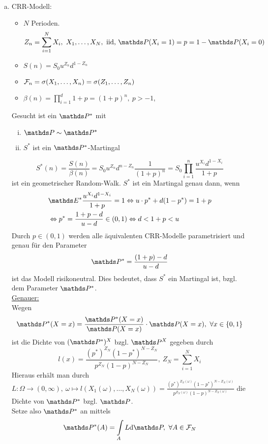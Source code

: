 \begin{enumerate}[(a)]
	\item CRR-Modell:
	\begin{itemize}
		\item $N$ Perioden.
		\[
		Z_n=\sum_{i=1}^{N}X_i,~X_1,\dots,X_N,\text{ iid, }\Pw(X_i=1)=p=1-\Pw(X_i=0)
		\]
		\item $S(n)=S_0u^{Z_n}d^{1-Z_n}$
		\item $\mathcal{F}_n=\sigma(X_1,\dots,X_n)=\sigma(Z_1,\dots,Z_n)$
		\item $\beta(n)=\prod_{i=1}^{d}1+p=(1+p)^n,~p>-1$,
	\end{itemize}
	Gesucht ist ein $\Pw^*$ mit 
	\begin{enumerate}[(i)]
		\item $\Pw \sim \Pw^*$
		\item $S^*$ ist ein $\Pw^*$-Martingal
	\end{enumerate}
	\[
	S^*(n)=\frac{S(n)}{\beta(n)}=S_0u^{Z_n}d^{n-Z_n}\frac{1}{(1+p)^n}=S_0\prod_{i=1}^{n}\frac{u^{X_i}d^{1-X_i}}{1+p}
	\]
	ist ein geometrischer Random-Walk.
	$S^*$ ist ein Martingal genau dann, wenn
	\begin{equation*}
	\begin{aligned}
		&\E^*\frac{u^{X_i}d^{1-X_i}}{1+p}=1 \Leftrightarrow u\cdot p^*+d(1-p^*)=1+p\\
		&\Leftrightarrow p^*=\frac{1+p-d}{u-d}\in (0,1) \Leftrightarrow d<1+p<u
	\end{aligned}
	\end{equation*}
	Durch $p\in(0,1)$ werden alle äquivalenten CRR-Modelle parametrisiert und genau für den Parameter
	\[
	\Pw^*=\frac{(1+p)-d}{u-d}
	\]
	ist das Modell risikoneutral.
	Dies bedeutet, dass $S^*$ ein Martingal ist, bzgl. dem Parameter $\Pw^*$.\\
	\uline{Genauer:}\\
	Wegen 
	\[
	\Pw^*(X=x)=\frac{\Pw^*(X=x)}{\Pw(X=x)}\cdot \Pw(X=x),~\forall x\in \{0,1\}
	\]
	ist die Dichte von $(\Pw^*)^X$ bzgl. $\Pw^X$ gegeben durch
	\[
	l(x)=\frac{(p^*)^{Z_N}(1-p^*)^{N-Z_N}}{p^{Z_N}(1-p)^{N-Z_N}},~Z_N=\sum_{i=1}^{N}X_i
	\]
	Hieraus erhält man durch $L:\Omega\to(0,\infty),~\omega\mapsto l(X_1(\omega),\dots,X_N(\omega))=\frac{(p^*)^{Z_N(\omega)}(1-p^*)^{N-Z_N(\omega)}}{p^{Z_N(\omega)}(1-p)^{N-Z_N(\omega)}}$ die Dichte von $\Pw^*$ bzgl. $\Pw$.\\
	Setze also $\Pw^*$ an mittels
	\[
	\Pw^*(A)=\int\limits_A L\dint \Pw,~\forall A\in \F_N
\]
\end{enumerate}
